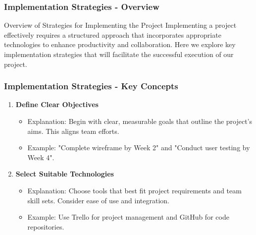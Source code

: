 \documentclass[aspectratio=169]{beamer}
\begin{document}
\begin{frame}[fragile]
    \frametitle{Implementation Strategies - Overview}
    \begin{block}{Overview of Strategies for Implementing the Project}
        Implementing a project effectively requires a structured approach that incorporates appropriate technologies to enhance productivity and collaboration. 
        Here we explore key implementation strategies that will facilitate the successful execution of our project.
    \end{block}
\end{frame}

\begin{frame}[fragile]
    \frametitle{Implementation Strategies - Key Concepts}
    \begin{enumerate}
        \item \textbf{Define Clear Objectives}
            \begin{itemize}
                \item Explanation: Begin with clear, measurable goals that outline the project's aims. This aligns team efforts.
                \item Example: "Complete wireframe by Week 2" and "Conduct user testing by Week 4".
            \end{itemize}
        
        \item \textbf{Select Suitable Technologies}
            \begin{itemize}
                \item Explanation: Choose tools that best fit project requirements and team skill sets. Consider ease of use and integration.
                \item Example: Use Trello for project management and GitHub for code repositories.
            \end{itemize}
    \end{enumerate}
\end{frame}
\end{document}
